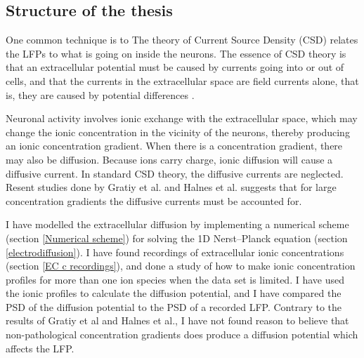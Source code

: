 \documentclass{article}
\begin{document}
\subsection{Structure of the thesis}
  One common technique is to 
The theory of Current Source Density (CSD) relates the LFPs to what is going on inside the neurons. The essence of CSD theory is that an extracellular potential must be caused by currents going into or out of cells, and that the currents in the extracellular space are field currents alone, that is, they are caused by potential differences \cite{Gratiy2017}. 

Neuronal activity involves ionic exchange with the extracellular space, which may change the ionic concentration in the vicinity of the neurons, thereby producing an ionic concentration gradient. When there is a concentration gradient, there may also be diffusion. Because ions carry charge, ionic diffusion will cause a diffusive current. In standard CSD theory, the diffusive currents are neglected. Resent studies done by Gratiy et al. and Halnes et al. suggests that for large concentration gradients the diffusive currents must be accounted for. 



 I have modelled the extracellular diffusion by implementing a numerical scheme (section \ref{Numerical scheme}) for solving the 1D  Nerst--Planck equation (section  \ref{electrodiffusion}). I have found recordings of extracellular ionic concentrations (section \ref{EC c recordings}), and done a study of how to make ionic concentration profiles for more than one ion species when the data set is limited. I have used the ionic profiles to calculate the diffusion potential, and I have compared the PSD of the diffusion potential to the PSD of a recorded LFP.  Contrary to the results of Gratiy et al and Halnes et al., I have not found reason to believe that non-pathological concentration gradients does produce a diffusion potential which affects the LFP. 
\end{document}
